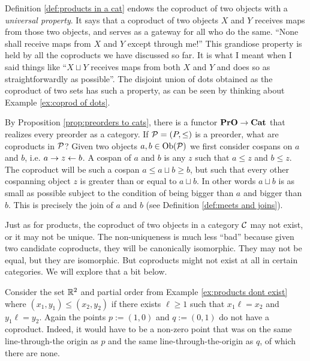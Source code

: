 \begin{remark}

Definition \ref{def:products in a cat} endows the coproduct of two objects with a {\em universal property}. It says that a coproduct of two objects $X$ and $Y$ receives maps from those two objects, and serves as a gateway for all who do the same. “None shall receive maps from $X$ and $Y$ except through me!” This grandiose property is held by all the coproducts we have discussed so far. It is what I meant when I said things like “$X\sqcup Y$ receives maps from both $X$ and $Y$ and does so as straightforwardly as possible”.  The disjoint union of dots obtained as the coproduct of two sets has such a property, as can be seen by thinking about Example \ref{ex:coprod of dots}.

\end{remark}

\begin{example}

By Proposition \ref{prop:preorders to cats}, there is a functor ${\bf PrO}\rightarrow{\bf Cat}$ that realizes every preorder as a category. If $\mathcal{P}=(P,\leq)$ is a preorder, what are coproducts in $\mathcal{P}$? Given two objects $a,b\in\textnormal{Ob}(\mathcal{P})$ we first consider cospans on $a$ and $b$, i.e. $a\rightarrow z\leftarrow b$. A cospan of $a$ and $b$ is any $z$ such that $a\leq z$ and $b\leq z$. The coproduct will be such a cospan $a\leq a\sqcup b\geq b$, but such that every other cospanning object $z$ is greater than or equal to $a\sqcup b$. In other words $a\sqcup b$ is as small as possible subject to the condition of being bigger than $a$ and bigger than $b$. This is precisely the join of $a$ and $b$ (see Definition \ref{def:meets and joins}).

\end{example}

Just as for products, the coproduct of two objects in a category $\mathcal{C}$ may not exist, or it may not be unique. The non-uniqueness is much less “bad” because given two candidate coproducts, they will be canonically isomorphic. They may not be equal, but they are isomorphic. But coproducts might not exist at all in certain categories. We will explore that a bit below.

\begin{example}

Consider the set ${\mathbb R}^2$ and partial order from Example \ref{ex:products dont exist} where $(x_1,y_1)\leq (x_2,y_2)$ if there exists $\ell\geq 1$ such that $x_1\ell=x_2$ and $y_1\ell=y_2$. Again the points $p:=(1,0)$ and $q:=(0,1)$ do not have a coproduct. Indeed, it would have to be a non-zero point that was on the same line-through-the origin as $p$ and the same line-through-the-origin as $q$, of which there are none.

\end{example}

